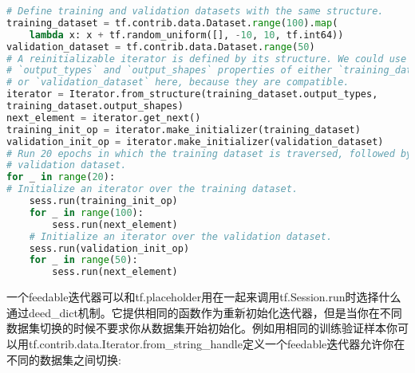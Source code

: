 \begin{lstlisting}[language=Python]
# Define training and validation datasets with the same structure.
training_dataset = tf.contrib.data.Dataset.range(100).map(
    lambda x: x + tf.random_uniform([], -10, 10, tf.int64))
validation_dataset = tf.contrib.data.Dataset.range(50)
# A reinitializable iterator is defined by its structure. We could use the
# `output_types` and `output_shapes` properties of either `training_dataset`
# or `validation_dataset` here, because they are compatible.
iterator = Iterator.from_structure(training_dataset.output_types,
training_dataset.output_shapes)
next_element = iterator.get_next()
training_init_op = iterator.make_initializer(training_dataset)
validation_init_op = iterator.make_initializer(validation_dataset)
# Run 20 epochs in which the training dataset is traversed, followed by the
# validation dataset.
for _ in range(20):
# Initialize an iterator over the training dataset.
    sess.run(training_init_op)
    for _ in range(100):
        sess.run(next_element)
    # Initialize an iterator over the validation dataset.
    sess.run(validation_init_op)
    for _ in range(50):
        sess.run(next_element)
\end{lstlisting}
一个feedable迭代器可以和tf.placeholder用在一起来调用tf.Session.run时选择什么通过deed\_dict机制。它提供相同的函数作为重新初始化迭代器，但是当你在不同数据集切换的时候不要求你从数据集开始初始化。例如用相同的训练验证样本你可以用tf.contrib.data.Iterator.from\_string\_handle定义一个feedable迭代器允许你在不同的数据集之间切换:
